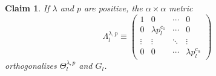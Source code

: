 \documentclass{article}
\numberwithin{myclaim}{section}
\newtheorem{claim}{Claim}
\begin{document}
\begin{claim} \label{claim:formula_for_Lambda_l}
If $\lambda$ and $p$ are positive, the $\alpha \times \alpha$ metric
\begin{equation}
    \Lambda^{\lambda,p}_l \equiv 
    \left( 
    \begin{array}{cccc} 
        1 & 0 &\cdots & 0 \\
        0 & \lambda p^{c_1}_l & \cdots &  0  \\
        \vdots & \vdots & \ddots & \vdots \\
        0 & 0 & \cdots & \lambda p^{c_\alpha}_l  
    \end{array} \right)
\end{equation}
orthogonalizes $\Theta_l^{\lambda,p}$ and $G_l$. 
\end{claim}
\end{document}
